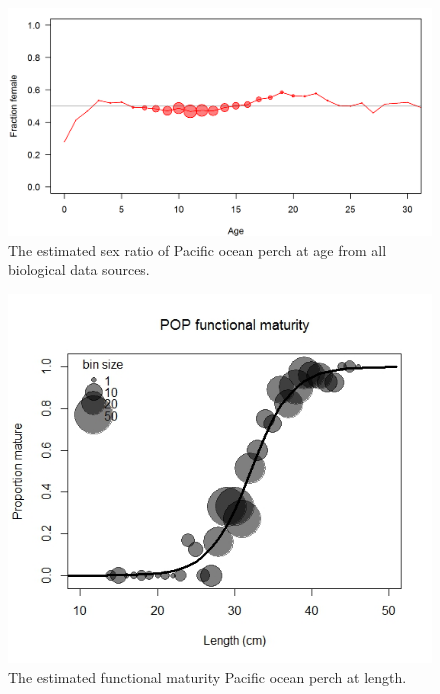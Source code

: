 \documentclass[12pt,]{article}
\begin{document}
\begin{figure}
\centering
\includegraphics{Figures/allSexRatiosAge.png}
\caption{The estimated sex ratio of Pacific ocean perch at age from all
biological data sources. \label{fig:sexratio_Age}}
\end{figure}

\begin{figure}
\centering
\includegraphics{Figures/Functional_Maturity.png}
\caption{The estimated functional maturity Pacific ocean perch at
length. \label{fig:mat}}
\end{figure}
\end{document}
